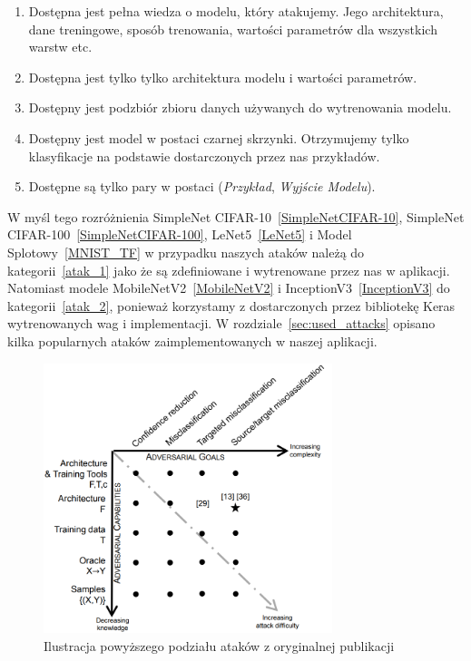\documentclass[
    left=2.5cm,         %
    right=2.5cm,        %
    top=2.5cm,          %
    bottom=3cm,         %
    bindingoffset=6mm,  %
    nohyphenation=false %
]{eiti/eiti-thesis}
\begin{document}
\begin{enumerate}
    \item \label{atak_1} Dostępna jest pełna wiedza o modelu, który atakujemy. Jego architektura, dane treningowe, sposób trenowania, wartości parametrów dla wszystkich warstw etc.
    \item \label{atak_2} Dostępna jest tylko tylko architektura modelu i wartości parametrów.
    \item Dostępny jest podzbiór zbioru danych używanych do wytrenowania modelu.
    \item Dostępny jest model w postaci czarnej skrzynki. Otrzymujemy tylko klasyfikacje na podstawie dostarczonych przez nas przykładów.
    \item Dostępne są tylko pary w postaci (\textit{Przykład}, \textit{Wyjście Modelu}).
\end{enumerate}
W myśl tego rozróżnienia SimpleNet CIFAR-10~\ref{SimpleNetCIFAR-10}, SimpleNet CIFAR-100~\ref{SimpleNetCIFAR-100},
LeNet5~\ref{LeNet5} i Model Splotowy~\ref{MNIST_TF} w przypadku naszych ataków należą do kategorii~\ref{atak_1} jako że są zdefiniowane i wytrenowane przez nas w aplikacji.
Natomiast modele MobileNetV2~\ref{MobileNetV2} i InceptionV3~\ref{InceptionV3} do kategorii~\ref{atak_2}, ponieważ korzystamy z dostarczonych przez bibliotekę Keras wytrenowanych wag i implementacji.
W rozdziale~\ref{sec:used_attacks} opisano kilka popularnych ataków zaimplementowanych w naszej aplikacji.

\begin{figure}[H]
    \begin{center}
        \includegraphics[width=0.75\textwidth]{eiti/attacks_taxonomy.png}
    \end{center}
    \caption{Ilustracja powyższego podziału ataków z oryginalnej publikacji~\cite{DBLP:journals/corr/PapernotMJFCS15}}
\end{figure}
\end{document}
